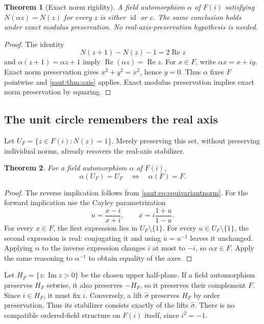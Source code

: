 \documentclass[11pt]{article}
\newtheorem{theorem}{Theorem}[section]
\theoremstyle{definition}
\theoremstyle{remark}
\newcommand{\id}{\operatorname{id}}
\newcommand{\re}{\operatorname{Re}}
\newcommand{\im}{\operatorname{Im}}
\numberwithin{equation}{section}
\begin{document}
\begin{theorem}[Exact norm rigidity]\label{saut:thm:norm}
A field automorphism $\alpha$ of $F(i)$ satisfying
$N(\alpha z)=N(z)$ for every $z$ is either $\id$ or $c$.
The same conclusion holds under exact modulus preservation.
No real-axis-preservation hypothesis is needed.
\end{theorem}
\begin{proof}
The identity
\[
 N(z+1)-N(z)-1=2\re z
\]
and $\alpha(z+1)=\alpha z+1$ imply $\re(\alpha z)=\re z$.
For $x\in F$, write $\alpha x=x+iy$. Exact norm preservation gives
$x^2+y^2=x^2$, hence $y=0$. Thus $\alpha$ fixes $F$ pointwise and
\cref{saut:thm:axis} applies. Exact modulus preservation implies exact norm
preservation by squaring.
\end{proof}

\subsection{The unit circle remembers the real axis}

Let $U_F=\{z\in F(i):N(z)=1\}$. Merely preserving this set, without preserving
individual norms, already recovers the real-axis stabilizer.

\begin{theorem}\label{saut:thm:circle}
For a field automorphism $\alpha$ of $F(i)$,
\[
 \alpha(U_F)=U_F\quad\Longleftrightarrow\quad\alpha(F)=F.
\]
\end{theorem}
\begin{proof}
The reverse implication follows from \eqref{saut:eq:equivariantnorm}. For the
forward implication use the Cayley parametrization
\[
 u=\frac{x-i}{x+i},\qquad
 x=i\frac{1+u}{1-u}.
\]
For every $x\in F$, the first expression lies in $U_F\setminus\{1\}$.
For every $u\in U_F\setminus\{1\}$, the second expression is real: conjugating
it and using $\bar u=u^{-1}$ leaves it unchanged. Applying $\alpha$ to the
inverse expression changes $i$ at most to $-i$, so $\alpha x\in F$.
Apply the same reasoning to $\alpha^{-1}$ to obtain equality of the axes.
\end{proof}

Let $H_F=\{z:\im z>0\}$ be the chosen upper half-plane. If a field
automorphism preserves $H_F$ setwise, it also preserves $-H_F$, so it
preserves their complement $F$. Since $i\in H_F$, it must fix $i$.
Conversely, a lift $\widehat\sigma$ preserves $H_F$ by order preservation.
Thus its stabilizer consists exactly of the lifts $\widehat\sigma$. There is no compatible ordered-field structure on $F(i)$
itself, since $i^2=-1$.
\end{document}

